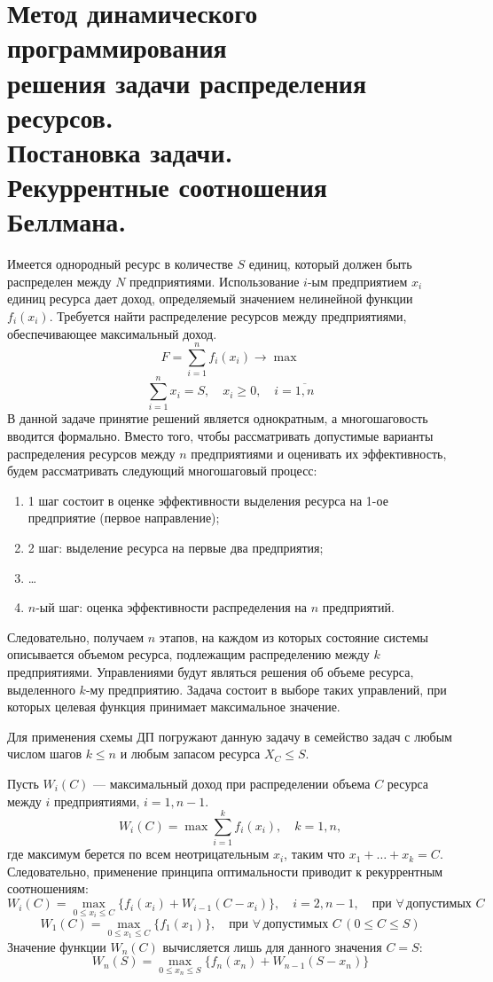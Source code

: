 \documentclass[17pt]{extarticle}
\begin{document}
\section{Метод динамического программирования \\ решения задачи распределения ресурсов. \\ Постановка задачи. \\ Рекуррентные соотношения Беллмана.}
Имеется однородный ресурс в количестве \( S \) единиц, который должен быть распределен между \( N \) предприятиями.
Использование \( i \)-ым предприятием \( x_i \) единиц ресурса дает доход, определяемый значением нелинейной функции \( f_i(x_i) \).
Требуется найти распределение ресурсов между предприятиями, обеспечивающее максимальный доход.
\[
    F = \sum_{i=1}^n f_i(x_i) \rightarrow \max
\]
\[
    \sum_{i=1}^n x_i = S, \quad x_i \geq 0, \quad i = \overline{1, n}
\]
В данной задаче принятие решений является однократным, а многошаговость вводится формально.
Вместо того, чтобы рассматривать допустимые варианты распределения ресурсов между \( n \) предприятиями и оценивать их эффективность,
будем рассматривать следующий многошаговый процесс:

\begin{enumerate}
    \item 1 шаг состоит в оценке эффективности выделения ресурса на 1-ое предприятие (первое направление);
    \item 2 шаг: выделение ресурса на первые два предприятия;
    \item \ldots
    \item \( n \)-ый шаг: оценка эффективности распределения на \( n \) предприятий.
\end{enumerate}

Следовательно, получаем \( n \) этапов, на каждом из которых состояние системы описывается объемом ресурса,
подлежащим распределению между \( k \) предприятиями.
Управлениями будут являться решения об объеме ресурса, выделенного \( k \)-му предприятию.
Задача состоит в выборе таких управлений, при которых целевая функция принимает максимальное значение.

Для применения схемы ДП погружают данную задачу в семейство
задач с любым числом шагов $k \leq n$ и любым запасом ресурса $X_C \leq S$.

Пусть \( W_i(C) \) — максимальный доход при распределении объема \( C \) ресурса между \( i \) предприятиями, \( i = 1, n-1 \).
\[
    W_i(C) = \max \sum_{i=1}^k f_i(x_i), \quad k = 1, n,
\]
где максимум берется по всем неотрицательным \( x_i \), таким что \( x_1 + \ldots + x_k = C \).
Следовательно, применение принципа оптимальности приводит к рекуррентным соотношениям:
\[
    W_i(C) = \max_{0 \leq x_i \leq C} \{ f_i(x_i) + W_{i-1}(C - x_i) \}, \quad i = 2, n-1, \quad \text{при } \forall \, \text{допустимых } C
\]
\[
    W_1(C) = \max_{0 \leq x_1 \leq C} \{ f_1(x_1) \}, \quad \text{при } \forall \, \text{допустимых } C \, (0 \leq C \leq S)
\]
Значение функции \( W_n(C) \) вычисляется лишь для данного значения \( C = S \):
\[
    W_n(S) = \max_{0 \leq x_n \leq S} \{ f_n(x_n) + W_{n-1}(S - x_n) \}
\]
\end{document}
